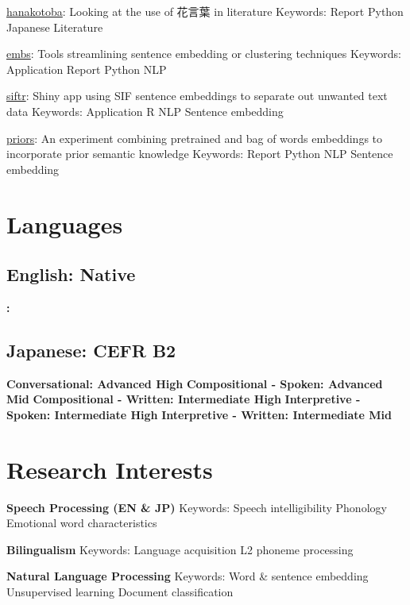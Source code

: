 \documentclass[letterpaper]{deedy-resume_sm}
\begin{document}
\href{https://github.com/ryancahildebrandt/hanakotoba}{hanakotoba}: Looking at the use of 花言葉 in literature 
Keywords: Report \textbullet{} Python \textbullet{} Japanese \textbullet{} Literature

\href{https://github.com/ryancahildebrandt/embs}{embs}: Tools streamlining sentence embedding or clustering techniques
Keywords: Application \textbullet{} Report \textbullet{} Python \textbullet{} NLP

\href{https://github.com/ryancahildebrandt/siftr}{siftr}: Shiny app using SIF sentence embeddings to separate out unwanted text data
Keywords: Application \textbullet{} R \textbullet{} NLP \textbullet{} Sentence embedding

\href{https://github.com/ryancahildebrandt/priors}{priors}: An experiment combining pretrained and bag of words embeddings to incorporate prior semantic knowledge
Keywords: Report \textbullet{} Python \textbullet{} NLP \textbullet{} Sentence embedding

\section{Languages}
\subsection{English: Native}
\textbf{: }

\subsection{Japanese: CEFR B2}
\textbf{Conversational: Advanced High}
\textbf{Compositional - Spoken: Advanced Mid}
\textbf{Compositional - Written: Intermediate High}
\textbf{Interpretive - Spoken: Intermediate High}
\textbf{Interpretive - Written: Intermediate Mid}

\section{Research Interests}
\textbf{Speech Processing (EN \& JP)}
Keywords: Speech intelligibility \textbullet{} Phonology \textbullet{} Emotional word characteristics

\textbf{Bilingualism}
Keywords: Language acquisition \textbullet{} L2 phoneme processing

\textbf{Natural Language Processing}
Keywords: Word \& sentence embedding \textbullet{} Unsupervised learning \textbullet{} Document classification
\end{document}
